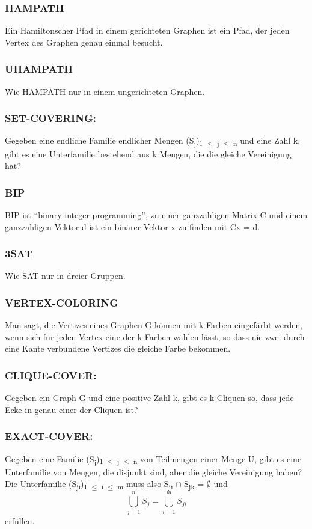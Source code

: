 \documentclass[11pt,twoside,landscape]{article}
\begin{document}
\begin{multicols}{2}
\subsubsection*{HAMPATH}
\label{sec:org2afbf8c}
Ein Hamiltonscher Pfad in einem gerichteten Graphen ist ein Pfad, der jeden Vertex des Graphen genau einmal besucht.
\subsubsection*{UHAMPATH}
\label{sec:org9828106}
Wie HAMPATH nur in einem ungerichteten Graphen. 
\subsubsection*{SET-COVERING:}
\label{sec:orgef1c308}
Gegeben eine endliche Familie endlicher Mengen (S\textsubscript{j})\textsubscript{1 \(\le\) j \(\le\) n} und eine Zahl k, gibt es eine Unterfamilie bestehend aus k Mengen, die die gleiche Vereinigung hat?

\subsubsection*{BIP}
\label{sec:org48426e4}
BIP ist “binary integer programming”, zu einer ganzzahligen Matrix C und einem ganzzahligen Vektor d ist ein binärer Vektor x zu finden mit Cx = d.
\subsubsection*{3SAT}
\label{sec:orgbc54229}
Wie SAT nur in dreier Gruppen.
\subsubsection*{VERTEX-COLORING}
\label{sec:orgfb2e412}
Man sagt, die Vertizes eines Graphen G können mit k Farben eingefärbt werden, wenn sich für jeden Vertex eine der k Farben wählen lässt, so dass nie zwei durch eine Kante verbundene Vertizes die gleiche Farbe bekommen.
\subsubsection*{CLIQUE-COVER:}
\label{sec:org392eb7b}
Gegeben ein Graph G und eine positive Zahl k, gibt es k Cliquen so, dass jede Ecke in genau einer der Cliquen ist?

\subsubsection*{EXACT-COVER:}
\label{sec:orgd7e915a}
Gegeben eine Familie (S\textsubscript{j})\textsubscript{1 \(\le\) j \(\le\) n} von Teilmengen einer Menge U, gibt es eine Unterfamilie von Mengen, die disjunkt sind, aber die gleiche Vereinigung haben? Die Unterfamilie (S\textsubscript{ji})\textsubscript{1 \(\le\) i \(\le\) m} muss also S\textsubscript{ji} \(\cap\) S\textsubscript{jk} = \(\emptyset\) und
$$
\bigcup^n_{j=1} S_j = \bigcup^m_{i=1} S_{ji}
$$
erfüllen.


\end{multicols}
\end{document}
